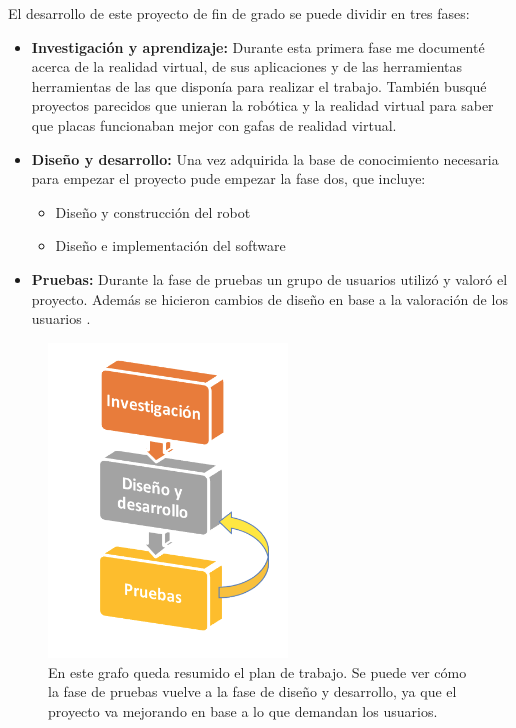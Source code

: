 \documentclass[twoside, 11pt]{epstfg}
\begin{document}
El desarrollo de este proyecto de fin de grado se puede dividir en tres fases:
\begin{itemize}
	\item \textbf{Investigación y aprendizaje:} Durante esta primera fase me documenté acerca de la realidad virtual, de sus aplicaciones y de las herramientas herramientas de las que disponía para realizar el trabajo. También busqué proyectos parecidos que unieran la robótica y la realidad virtual para saber que placas funcionaban mejor con gafas de realidad virtual.
	
	\item \textbf{Diseño y desarrollo:} Una vez adquirida la base de conocimiento necesaria para empezar el proyecto pude empezar la fase dos, que incluye:
	\begin{itemize}
		\item Diseño y construcción del robot
		\item Diseño e implementación del software
	\end{itemize}

	\item \textbf{Pruebas:} Durante la fase de pruebas un grupo de usuarios utilizó y valoró el proyecto. Además se hicieron cambios de diseño en base a la valoración de los usuarios .
\end{itemize}

\begin{figure}[H]
	\centerline{
		\mbox{\includegraphics[width=2.50in]{images/Plan.png}}
	}
	\caption{En este grafo queda resumido el plan de trabajo. Se puede ver cómo la fase de pruebas vuelve a la fase de diseño y desarrollo, ya que el proyecto va mejorando en base a lo que demandan los usuarios.}
\end{figure}
\newpage
\end{document}
